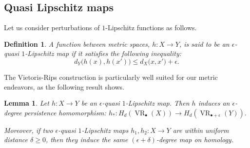 \documentclass[11pt]{article}
\newtheorem{defn}[thm]{Definition}
\newtheorem{lem}[thm]{Lemma}
\DeclareMathOperator{\VR}{VR}
\renewcommand{\H}{\operatorname{H}}
\newcommand{\bu}{_{\bullet}}
\begin{document}
\subsection{Quasi Lipschitz maps}

Let us consider perturbations of $1$-Lipschitz functions as follows.
\begin{defn}
A function between metric spaces, $h:X\to Y$, is said to be an $\epsilon$-quasi $1$-Lipschitz map if it satisfies the following inequality:
\[ d_Y\big(h(x),h(x')\big)\leq d_X\big(x,x'\big)+\epsilon.\]
\end{defn}

The Vietoris-Rips construction is particularly well suited for our metric endeavors, as the following result shows. 


\begin{lem}\label{lemma induced function on homology}
Let \( h : X \to Y \) be an \( \epsilon \)-quasi \( 1 \)-Lipschitz map. Then \( h \) induces an \( \epsilon \)-degree persistence homomorphism: $
h_* : H_d(\operatorname{VR}\bu(X)) \to H_d(\operatorname{VR}_{\bullet+\epsilon}(Y)).$


Moreover, if two \( \epsilon \)-quasi \( 1 \)-Lipschitz maps \( h_1, h_2 : X \to Y \) are within uniform distance \( \delta \geq 0 \), then they induce the same \( (\epsilon + \delta) \)-degree map on homology.
\end{lem}
\end{document}

